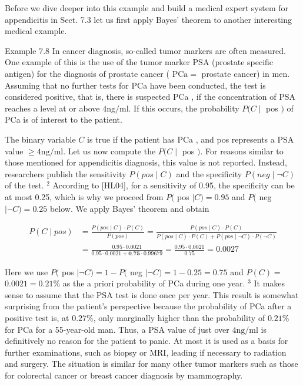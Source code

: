 \documentclass[10pt]{article}
\begin{document}
Before we dive deeper into this example and build a medical expert system for appendicitis in Sect. 7.3 let us first apply Bayes' theorem to another interesting medical example.

Example 7.8 In cancer diagnosis, so-called tumor markers are often measured. One example of this is the use of the tumor marker PSA (prostate specific antigen) for the diagnosis of prostate cancer ( $\mathrm{PCa}=$ prostate cancer) in men. Assuming that no further tests for PCa have been conducted, the test is considered positive, that is, there is suspected PCa , if the concentration of PSA reaches a level at or above $4 \mathrm{ng} / \mathrm{ml}$. If this occurs, the probability $P(C \mid$ pos $)$ of PCa is of interest to the patient.

The binary variable $C$ is true if the patient has PCa , and pos represents a PSA value $\geq 4 \mathrm{ng} / \mathrm{ml}$. Let us now compute the $P(C \mid$ pos $)$. For reasons similar to those mentioned for appendicitis diagnosis, this value is not reported. Instead, researchers publish the sensitivity $P(p o s \mid C)$ and the specificity $P(n e g \mid \neg C)$ of the test. ${ }^{2}$ According to [HL04], for a sensitivity of 0.95, the specificity can be at most 0.25, which is why we proceed from $P($ pos $\mid C)=0.95$ and $P($ neg $\mid \neg C)=0.25$ below. We apply Bayes' theorem and obtain

$$
\begin{aligned}
P(C \mid p o s) & =\frac{P(p o s \mid C) \cdot P(C)}{P(p o s)}=\frac{P(p o s \mid C) \cdot P(C)}{P(p o s \mid C) \cdot P(C)+P(p o s \mid \neg C) \cdot P(\neg C)} \\
& =\frac{0.95 \cdot 0.0021}{0.95 \cdot 0.0021+\mathbf{0 . 7 5} \cdot 0.99679}=\frac{0.95 \cdot 0.0021}{0.75}=0.0027
\end{aligned}
$$

Here we use $P($ pos $\mid \neg C)=1-P($ neg $\mid \neg C)=1-0.25=0.75$ and $P(C)=$ $0.0021=0.21 \%$ as the a priori probability of PCa during one year. ${ }^{3}$ It makes sense to assume that the PSA test is done once per year. This result is somewhat surprising from the patient's perspective because the probability of PCa after a positive test is, at $0.27 \%$, only marginally higher than the probability of $0.21 \%$ for PCa for a 55-year-old man. Thus, a PSA value of just over $4 \mathrm{ng} / \mathrm{ml}$ is definitively no reason for the patient to panic. At most it is used as a basis for further examinations, such as biopsy or MRI, leading if necessary to radiation and surgery. The situation is similar for many other tumor markers such as those for colorectal cancer or breast cancer diagnosis by mammography.
\end{document}
